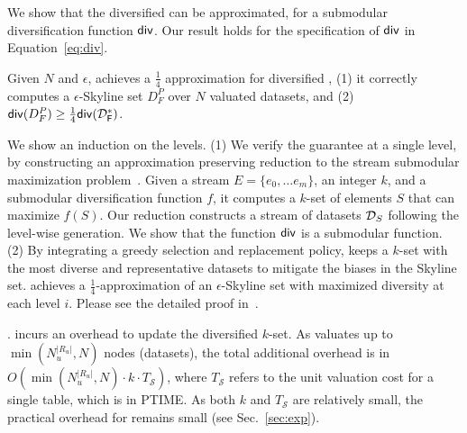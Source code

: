 We show that the diversified \modis 
can be approximated, 
for a submodular diversification function ${\mathsf{div}}$. 
Our result holds for the specification of 
${\mathsf{div}}$ in Equation~\ref{eq:div}. 

\begin{lemma} 
\label{lemma:div}
Given $N$ and $\epsilon$, 
\divmodis achieves a $\frac{1}{4}$ approximation for 
diversified \modis, \ie 
(1) it correctly computes a $\epsilon$-Skyline set $D^P_F$
over $N$ valuated datasets, and 
(2) ${\mathsf{div}}(D^P_F)\geq \frac{1}{4}{\mathsf{{\mathsf{div}}({\mathcal D}^*_F)}}$. 
\end{lemma}

\begin{proofS}
We show an induction on the levels. 
(1) We verify the guarantee at a single level, 
by constructing an approximation preserving 
reduction to the stream submodular maximization problem~\cite{chakrabarti2015submodular}. Given a  
 stream $E = \{e_0, \ldots e_m\}$, an integer $k$, and a submodular 
diversification function $f$, it
computes a $k$-set of elements $S$ 
that can maximize $f(S)$. 
Our reduction constructs a stream of 
datasets ${\mathcal D}_S$ following the level-wise 
generation. We show that 
the function ${\mathsf{div}}$ is 
a submodular function. 
(2) By integrating a 
greedy selection and replacement 
policy, 
\divmodis keeps a $k$-set with the most diverse and representative datasets to mitigate the biases in the Skyline set.
\divmodis achieves a $\frac{1}{4}$-approximation of an $\epsilon$-Skyline set with maximized diversity at each level $i$. 
Please see the detailed proof in~\cite{full}. 
\end{proofS}

.
\divmodis incurs an overhead to update the diversified $k$-set. 
As \modis valuates up to $\min(N_u^{|R_u|}, N)$ nodes (datasets), 
the total additional overhead is in $O(\min(N_u^{|R_u|}, N) \cdot k \cdot T_{\mathcal{S}})$, 
where $T_{\mathcal{S}}$ refers to the unit valuation cost for a single table, which is in PTIME. 
As both $k$ and $T_{\mathcal{S}}$ are relatively small, 
the practical overhead for \divmodis remains small (see Sec.~\ref{sec:exp}). 


